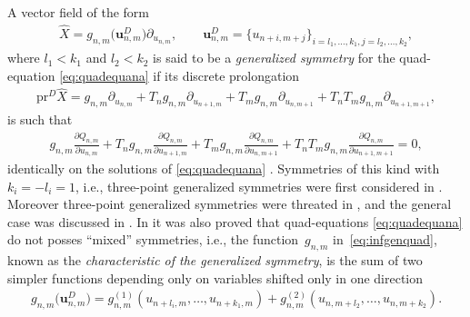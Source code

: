 \documentclass[pdftex]{sigma}
\numberwithin{equation}{section}
\begin{document}
A vector f\/ield of the form
\begin{gather}
 \hat X = g_{n,m}\big( \mathbf{u}_{n,m}^{D} \big) \partial_{u_{n,m}},
 \qquad \mathbf{u}_{n,m}^{D}
 = \{ u_{n+i,m+j} \}_{i=l_{1},\dots,k_{1},j=l_{2},\dots,k_{2}},\label{eq:infgenquad}
\end{gather}
where $l_{1}<k_{1}$ and $l_{2}<k_{2}$ is said to be a \emph{generalized symmetry} for the quad-equation \eqref{eq:quadequana} if its discrete
prolongation
\begin{gather*}
\mathrm{pr}^{D}\hat X = g_{n,m}\partial_{u_{n,m}} +T_{n}g_{n,m}\partial_{u_{n+1,m}}+T_{m}g_{n,m}\partial_{u_{n,m+1}}+T_{n}T_{m}g_{n,m}\partial_{u_{n+1,m+1}},
\end{gather*}
is such that
\begin{gather*}
g_{n,m} \frac{\partial Q_{n,m}}{\partial u_{n,m}}
 +T_n g_{n,m} \frac{\partial Q_{n,m}}{\partial u_{n+1,m}}
 + T_m g_{n,m} \frac{\partial Q_{n,m}}{\partial u_{n,m+1}}
 + T_n T_m g_{n,m}\frac{\partial Q_{n,m}}{\partial u_{n+1,m+1}} =0,%
\end{gather*}
identically on the solutions of \eqref{eq:quadequana} \cite{Garifullin2012}. Symmetries of this kind with $k_{i}=-l_{i}=1$, i.e., three-point generalized symmetries were f\/irst considered in \cite{Hydon2007}. Moreover three-point generalized symmetries were threated in \cite{LeviYamilov2009,LeviYamilov2011}, and the general case was discussed in \cite{Garifullin2012}. In \cite{Garifullin2012} it was also proved that quad-equations \eqref{eq:quadequana} do not posses ``mixed'' symmetries, i.e., the function~$g_{n,m}$ in~\eqref{eq:infgenquad}, known as the \emph{characteristic of the generalized symmetry}, is the sum of two simpler functions depending only on variables shifted only in one direction
\begin{gather*}
 g_{n,m}\big( \mathbf{u}_{n,m}^{D} \big) = g_{n,m}^{(1)} ( u_{n+l_{i},m},\dots,u_{n+k_{1},m} ) + g_{n,m}^{(2)}( u_{n,m+l_{2}},\dots,u_{n,m+k_{2}}). %
\end{gather*}
\end{document}
